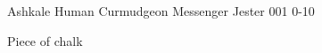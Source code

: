 
\begin{filledCS}%
  {Ashkale}%
  {Human}%
  {Curmudgeon Messenger}%
  {Jester}%
  {{0}{0}{1}}%
  {{0}{-1}{0}}%
  {%
    \setcounter{Athletics}{2}
    \setcounter{Stealth}{1}
    \setcounter{Cultivation}{1}

    \setcounter{Melee}{1}
    \addtocounter{equipmentWeight}{-1}
  }%
  {\charge}%
  {Piece of chalk}%

\end{filledCS}


